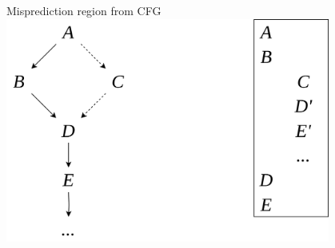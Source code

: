 \documentclass{beamer}
\begin{document}
\begin{frame}{Misprediction region from CFG}
    \includegraphics[width=0.8\textwidth]{pic/cfg-to-mispred-reg.drawio.png}
\end{frame}
\end{document}
